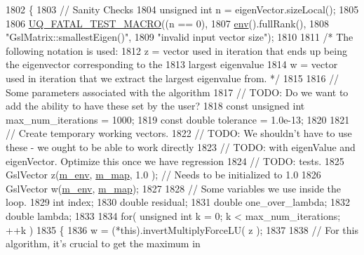 \begin{DoxyCode}
1802 \{
1803   \textcolor{comment}{// Sanity Checks}
1804   \textcolor{keywordtype}{unsigned} \textcolor{keywordtype}{int} n = eigenVector.sizeLocal();
1805 
1806   \hyperlink{_defines_8h_a56d63d18d0a6d45757de47fcc06f574d}{UQ\_FATAL\_TEST\_MACRO}((n == 0),
1807                       \hyperlink{class_q_u_e_s_o_1_1_matrix_a1eefeca9f35200e8275fb0fdfa0c8684}{env}().fullRank(),
1808                       \textcolor{stringliteral}{"GslMatrix::smallestEigen()"},
1809                       \textcolor{stringliteral}{"invalid input vector size"});
1810 
1811   \textcolor{comment}{/* The following notation is used:}
1812 \textcolor{comment}{     z = vector used in iteration that ends up being the eigenvector corresponding to the}
1813 \textcolor{comment}{         largest eigenvalue}
1814 \textcolor{comment}{     w = vector used in iteration that we extract the largest eigenvalue from.  */}
1815 
1816   \textcolor{comment}{// Some parameters associated with the algorithm}
1817   \textcolor{comment}{// TODO: Do we want to add the ability to have these set by the user?}
1818   \textcolor{keyword}{const} \textcolor{keywordtype}{unsigned} \textcolor{keywordtype}{int} max\_num\_iterations = 1000;
1819   \textcolor{keyword}{const} \textcolor{keywordtype}{double} tolerance = 1.0e-13;
1820 
1821   \textcolor{comment}{// Create temporary working vectors.}
1822   \textcolor{comment}{// TODO: We shouldn't have to use these - we ought to be able to work directly}
1823   \textcolor{comment}{// TODO: with eigenValue and eigenVector. Optimize this once we have regression}
1824   \textcolor{comment}{// TODO: tests.}
1825   GslVector z(\hyperlink{class_q_u_e_s_o_1_1_matrix_a247fb0fc0b87fecdee054bb4660b68e8}{m\_env}, \hyperlink{class_q_u_e_s_o_1_1_matrix_adb42d344c0b2859c3b4a4f5a3dd7875f}{m\_map}, 1.0 ); \textcolor{comment}{// Needs to be initialized to 1.0}
1826   GslVector w(\hyperlink{class_q_u_e_s_o_1_1_matrix_a247fb0fc0b87fecdee054bb4660b68e8}{m\_env}, \hyperlink{class_q_u_e_s_o_1_1_matrix_adb42d344c0b2859c3b4a4f5a3dd7875f}{m\_map});
1827 
1828   \textcolor{comment}{// Some variables we use inside the loop.}
1829   \textcolor{keywordtype}{int} index;
1830   \textcolor{keywordtype}{double} residual;
1831   \textcolor{keywordtype}{double} one\_over\_lambda;
1832   \textcolor{keywordtype}{double} lambda;
1833 
1834   \textcolor{keywordflow}{for}( \textcolor{keywordtype}{unsigned} \textcolor{keywordtype}{int} k = 0; k < max\_num\_iterations; ++k )
1835     \{
1836       w = (*this).invertMultiplyForceLU( z );
1837 
1838       \textcolor{comment}{// For this algorithm, it's crucial to get the maximum in}

\end{DoxyCode}
